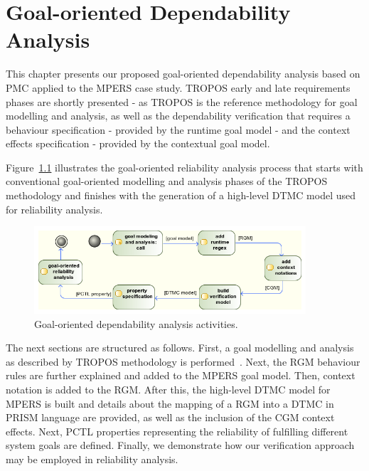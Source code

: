 \chapter{Goal-oriented Dependability Analysis}\label{ch:proposal}

This chapter presents our proposed goal-oriented dependability analysis based on PMC applied to the MPERS case study. TROPOS early and late requirements phases are shortly presented - as TROPOS is the reference methodology for goal modelling and analysis, as well as the dependability verification that requires a behaviour specification - provided by the runtime goal model -  and the context effects specification - provided by the contextual goal model.




Figure~\ref{fig:CRGM_TO_DTMC} illustrates the goal-oriented reliability analysis process that starts with conventional goal-oriented modelling and analysis phases of the TROPOS methodology and finishes with the generation of a high-level DTMC model used for reliability analysis. 


\begin{figure}[h!]
\centering
\includegraphics[width=0.9\textwidth]{imgs/CRGM_TO_DTMC.png}
\caption{Goal-oriented dependability analysis activities.}
\label{fig:CRGM_TO_DTMC}
\end{figure}

The next sections are structured as follows. First, a goal modelling and analysis as described by TROPOS methodology is performed~\cite{Bresciani:2004}. Next, the RGM behaviour rules are further explained and added to the MPERS goal model. Then, context notation is added to the RGM. After this, the high-level DTMC model for MPERS is built and details about the mapping of a RGM into a DTMC in PRISM language are provided, as well as the inclusion of the CGM context effects. Next, PCTL properties representing the reliability of fulfilling different system goals are defined. Finally, we demonstrate how our verification approach may be employed in reliability analysis. 


